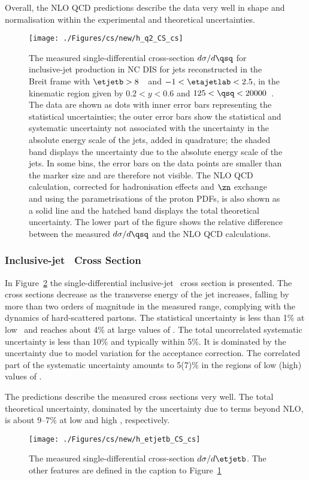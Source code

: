 Overall, the NLO QCD predictions describe the data very well in shape and normalisation within the experimental and theoretical uncertainties.
\begin{figure}[p]
	\centering
		\texttt{[image: ./Figures/cs/new/h\_q2\_CS\_cs]}
	\caption{The measured single-differential cross-section $d\sigma/d\qsq$ for inclusive-jet production in NC DIS for jets reconstructed in the Breit frame with $\etjetb > 8$~\GeV~and $-1<\etajetlab<2.5$, in the kinematic region given by $0.2<y<0.6$ and $125 < \qsq < 20000$~\GeV. The data are shown as dots with inner error bars representing the statistical uncertainties; the outer error bars show the statistical and systematic uncertainty not associated with the uncertainty in the absolute energy scale of the jets, added in quadrature; the shaded band displays the uncertainty due to the absolute energy scale of the jets. In some bins, the error bars on the data points are smaller than the marker size and are therefore not visible. The NLO QCD calculation, corrected for hadronisation effects and $\zn$ exchange and using the  parametrisations of the proton PDFs, is also shown as a solid line and the hatched band displays the total theoretical uncertainty. The lower part of the figure shows the relative difference between the measured $d\sigma/d\qsq$ and the NLO QCD calculations.} 
	\label{fig:inclusivesingledif_q2}
\end{figure}

\subsubsection*{Inclusive-jet \dsdetjetb~Cross Section}
In Figure~\ref{fig:inclusivesingledif_et} the single-differential inclusive-jet \dsdetjetb~cross section is presented. The cross sections decrease as the transverse energy of the jet increases, falling by more than two orders of magnitude in the measured range, complying with the dynamics of hard-scattered partons. The statistical uncertainty is less than 1\% at low \etjetb~and reaches about 4\% at large values of \etjetb. The total uncorrelated systematic uncertainty is less than 10\% and typically within 5\%. It is dominated by the uncertainty due to model variation for the acceptance correction. The correlated part of the systematic uncertainty amounts to 5(7)\%  in the regions of low (high) values of \etjetb.

The predictions describe the measured cross sections very well. The total theoretical uncertainty, dominated by the uncertainty due to terms beyond NLO, is about 9--7\% at low and high \etjetb, respectively. 
\begin{figure}[p]
	\centering
		\texttt{[image: ./Figures/cs/new/h\_etjetb\_CS\_cs]}
	\caption{The measured single-differential cross-section $d\sigma/d\etjetb$. The other features are defined in the caption to Figure~\ref{fig:inclusivesingledif_q2}}
	\label{fig:inclusivesingledif_et}
\end{figure}

